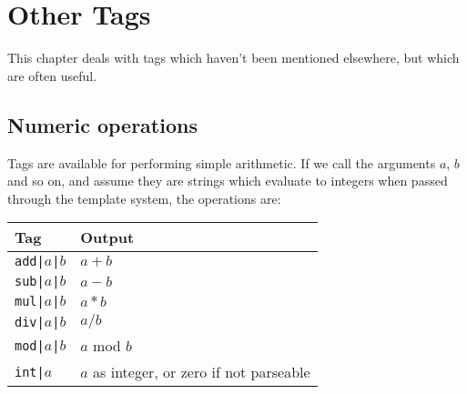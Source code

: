 %
%
%
%
%
%
% 
%
% 
% 
%

\chapter{Other Tags}

This chapter deals with tags which haven't been mentioned elsewhere, but which are often useful.

\section{Numeric operations}
Tags are available for performing simple arithmetic. If we
call the arguments $a$, $b$ and so on, and assume they are strings
which evaluate to integers when passed through the template system, the
operations are:
\begin{center}
\begin{tabular}{ll}
\textbf{Tag} & \textbf{Output} \\
\hline
\texttt{add|$a$|$b$} & $a+b$ \\
\texttt{sub|$a$|$b$} & $a-b$ \\
\texttt{mul|$a$|$b$} & $a*b$ \\
\texttt{div|$a$|$b$} & $a/b$ \\
\texttt{mod|$a$|$b$} & $a$ mod $b$ \\
\texttt{int|$a$} & $a$ as integer, or zero if not parseable\\
\end{tabular}
\end{center}

